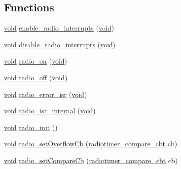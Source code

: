 \subsection*{Functions}
\begin{DoxyCompactItemize}
\item 
\hyperlink{usb__devapi_8h_afabf60e7f57651d6d595a02c75f07cd0}{void} \hyperlink{boards_2_open_mote-_c_c2538_2radio_8c_a527057b65b8b5f246541ec927dea421b}{enable\+\_\+radio\+\_\+interrupts} (\hyperlink{usb__devapi_8h_afabf60e7f57651d6d595a02c75f07cd0}{void})
\item 
\hyperlink{usb__devapi_8h_afabf60e7f57651d6d595a02c75f07cd0}{void} \hyperlink{boards_2_open_mote-_c_c2538_2radio_8c_a0704e3c6f4915bf86c11a13f2c43a273}{disable\+\_\+radio\+\_\+interrupts} (\hyperlink{usb__devapi_8h_afabf60e7f57651d6d595a02c75f07cd0}{void})
\item 
\hyperlink{usb__devapi_8h_afabf60e7f57651d6d595a02c75f07cd0}{void} \hyperlink{boards_2_open_mote-_c_c2538_2radio_8c_a8dd3850ce06cd0cb21562c88a68f024f}{radio\+\_\+on} (\hyperlink{usb__devapi_8h_afabf60e7f57651d6d595a02c75f07cd0}{void})
\item 
\hyperlink{usb__devapi_8h_afabf60e7f57651d6d595a02c75f07cd0}{void} \hyperlink{boards_2_open_mote-_c_c2538_2radio_8c_a8e45eb57b9735a140a860adab45cf688}{radio\+\_\+off} (\hyperlink{usb__devapi_8h_afabf60e7f57651d6d595a02c75f07cd0}{void})
\item 
\hyperlink{usb__devapi_8h_afabf60e7f57651d6d595a02c75f07cd0}{void} \hyperlink{boards_2_open_mote-_c_c2538_2radio_8c_aa81001b0c094ac194e24d4ba48cfc484}{radio\+\_\+error\+\_\+isr} (\hyperlink{usb__devapi_8h_afabf60e7f57651d6d595a02c75f07cd0}{void})
\item 
\hyperlink{usb__devapi_8h_afabf60e7f57651d6d595a02c75f07cd0}{void} \hyperlink{boards_2_open_mote-_c_c2538_2radio_8c_a266c0855205309c25a5c63f3d9acf353}{radio\+\_\+isr\+\_\+internal} (\hyperlink{usb__devapi_8h_afabf60e7f57651d6d595a02c75f07cd0}{void})
\item 
\hyperlink{usb__devapi_8h_afabf60e7f57651d6d595a02c75f07cd0}{void} \hyperlink{group__radio_gacfb21351bb3f0146635745bfacfe26a8}{radio\+\_\+init} ()
\item 
\hyperlink{usb__devapi_8h_afabf60e7f57651d6d595a02c75f07cd0}{void} \hyperlink{group__radio_gaac2272f2a27534c5223d20f7eb4dbb26}{radio\+\_\+set\+Overflow\+Cb} (\hyperlink{group__radiotimer_ga62b602325e65023c91b784f20cd2d6bc}{radiotimer\+\_\+compare\+\_\+cbt} cb)
\item 
\hyperlink{usb__devapi_8h_afabf60e7f57651d6d595a02c75f07cd0}{void} \hyperlink{group__radio_ga49e8fc5745ce8569b6d2616883579062}{radio\+\_\+set\+Compare\+Cb} (\hyperlink{group__radiotimer_ga62b602325e65023c91b784f20cd2d6bc}{radiotimer\+\_\+compare\+\_\+cbt} cb)

\end{DoxyCompactItemize}
